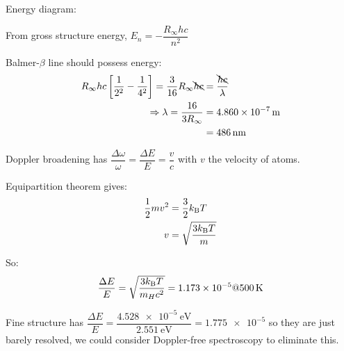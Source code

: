 \begin{parts}
	Energy diagram:
	
	From gross structure energy, $E_n = -\dfrac{R_\infty hc}{n^2}$
	
	Balmer-$\beta$ line should possess energy:
	\begin{align*}
		R_\infty hc\left[\frac{1}{2^2} - \frac{1}{4^2}\right] = \frac{3}{16} R_\infty \bcancel{hc} &= \frac{\bcancel{hc}}{\lambda} \\
		\Rightarrow \lambda = \frac{16}{3R_\infty} &= \SI{4.860e-7}{\metre} \\
		&= \SI{486}{\nano\metre}
	\end{align*}
	
	Doppler broadening has $\dfrac{\Delta\omega}{\omega}=\dfrac{\Delta E}{E}=\dfrac{v}{c}$ with $v$ the velocity of atoms.
	
	Equipartition theorem gives:
	\begin{align*}
		\frac{1}{2}mv^2 &= \frac{3}{2}k_\mathrm{B} T \\
		v &= \sqrt{\frac{3k_\mathrm{B} T}{m}}
	\end{align*}
	
	So:
	\begin{equation*}
		\frac{\Delta E}{E} = \sqrt{\frac{3k_\mathrm{B} T}{m_Hc^2}} = \num{1.173e-5} @ \SI{500}{\kelvin}
	\end{equation*}
	
	Fine structure has $\dfrac{\Delta E}{E}=\dfrac{\SI{4.528e-5}{\electronvolt}}{\SI{2.551}{\electronvolt}}=\num{1.775e-5}$ so they are just barely resolved, we could consider Doppler-free spectroscopy to eliminate this.
\end{parts}

